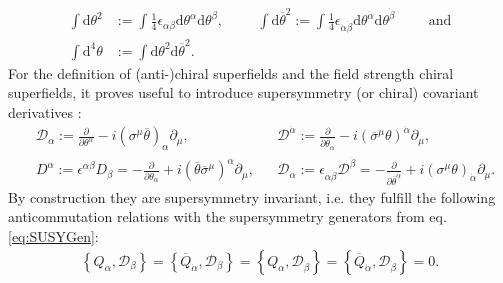 \begin{align}
\int \mathrm{d}\theta^2 &:= \int\frac{1}{4}\epsilon_{\alpha\beta} \mathrm{d}\theta^\alpha\mathrm{d}\theta^\beta, \hspace{1cm}
\int \mathrm{d}\overline{\theta}^2 := \int\frac{1}{4}\epsilon_{\dot{\alpha}\dot{\beta}} \mathrm{d}\theta^{\dot{\alpha}}\mathrm{d}\theta^{\dot{\beta}} \hspace{1cm} \mathrm{and} \nonumber\\
\int \mathrm{d}^4\theta &:= \int \mathrm{d}\theta^2\mathrm{d}\overline{\theta}^2.
\end{align}
For the definition of (anti-)chiral superfields and the field strength chiral superfields, it proves useful to introduce supersymmetry (or chiral) covariant derivatives :
\begin{align}
&\mathcal{D}_\alpha := \frac{\partial}{\partial \theta^\alpha} - i(\sigma^\mu\overline{\theta})_\alpha\partial_\mu, && \mathcal{D}^{\dot{\alpha}} := \frac{\partial}{\partial \overline{\theta}_{\dot{\alpha}}} - i(\overline{\sigma}^\mu\theta)^{\dot{\alpha}} \partial_\mu,\nonumber\\
&D^\alpha := \epsilon^{\alpha\beta} D_\beta = -\frac{\partial}{\partial \theta_\alpha} + i(\overline{\theta} \overline{\sigma}^\mu)^\alpha \partial_\mu, && \mathcal{D}_{\dot{\alpha}} := \epsilon_{\dot{\alpha}\dot{\beta}} \mathcal{D}^{\dot{\beta}} = -\frac{\partial}{\partial \overline{\theta}^{\dot{\alpha}}} + i(\sigma^\mu\theta)_{\dot{\alpha}} \partial_\mu.
\end{align}
By construction they are supersymmetry invariant, i.e. they fulfill the following anticommutation relations with the supersymmetry generators from eq. \eqref{eq:SUSYGen}:
\begin{align}
\left\{ Q_\alpha, \mathcal{D}_\beta \right\} = \left\{ \overline{Q}_{\dot{\alpha}}, \mathcal{D}_\beta \right\} = \left\{ Q_\alpha, \mathcal{\mathcal{D}}_{\dot{\beta}} \right\} = \left\{ \overline{Q}_{\dot{\alpha}}, \mathcal{\mathcal{D}}_{\dot{\beta}} \right\} = 0.
\end{align}


